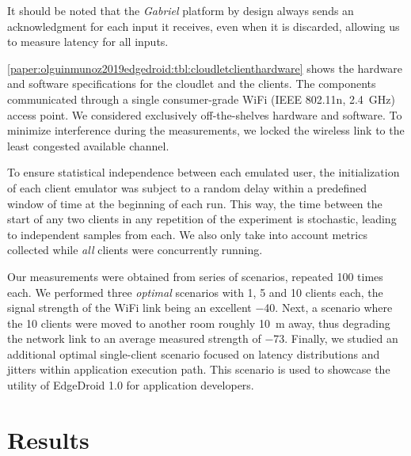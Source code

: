 It should be noted that the \emph{Gabriel} platform by design always sends an acknowledgment for each input it receives, even when it is discarded, allowing us to measure latency for all inputs.


\cref{paper:olguinmunoz2019edgedroid:tbl:cloudletclienthardware} shows the hardware and software specifications for the cloudlet and the clients.
The components communicated through a single consumer-grade WiFi (IEEE 802.11n, \SI{2.4}{\giga\hertz}) access point.
We considered exclusively off-the-shelves hardware and software.
To minimize interference during the measurements, we locked the wireless link to the least congested available channel.

To ensure statistical independence between each emulated user, the initialization of each client emulator was subject to a random delay within a predefined window of time at the beginning of each run.
This way, the time between the start of any two clients in any repetition of the experiment is stochastic, leading to independent samples from each.
We also only take into account metrics collected while \emph{all} clients were concurrently running.

Our measurements were obtained from series of scenarios, repeated 100 times each.
We performed three \emph{optimal} scenarios with 1, 5 and 10 clients each, the signal strength of the WiFi link being an excellent \SI{-40}{\dBm}.
Next, a scenario where the 10 clients were moved to another room roughly \SI{10}{\meter} away, thus degrading the network link to an average measured strength of \SI{-73}{\dBm}.
Finally, we studied an additional optimal single-client scenario focused on latency distributions and jitters within application execution path.
This scenario is used to showcase the utility of EdgeDroid 1.0 for application developers.

\section{Results}\label{paper:olguinmunoz2019edgedroid:sec:results}

